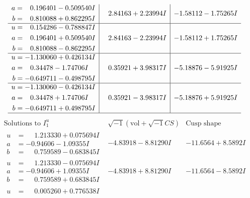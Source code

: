 \documentclass[1p]{elsarticle_modified}
\theoremstyle{definition}
\newcommand{\I}{\sqrt{-1}}
\begin{document}
$$\begin{array}{c|c|c}
\begin{aligned}
a &= \phantom{-}0.196401 - 0.509540 I \\
b &= \phantom{-}0.810088 + 0.862295 I\end{aligned}
 & \phantom{-}2.84163 + 2.23994 I & -1.58112 - 1.75265 I \\ \hline\begin{aligned}
u &= \phantom{-}0.154286 - 0.788847 I \\
a &= \phantom{-}0.196401 + 0.509540 I \\
b &= \phantom{-}0.810088 - 0.862295 I\end{aligned}
 & \phantom{-}2.84163 - 2.23994 I & -1.58112 + 1.75265 I \\ \hline\begin{aligned}
u &= -1.130060 + 0.426134 I \\
a &= \phantom{-}0.34478 - 1.74706 I \\
b &= -0.649711 - 0.498795 I\end{aligned}
 & \phantom{-}0.35921 + 3.98317 I & -5.18876 - 5.91925 I \\ \hline\begin{aligned}
u &= -1.130060 - 0.426134 I \\
a &= \phantom{-}0.34478 + 1.74706 I \\
b &= -0.649711 + 0.498795 I\end{aligned}
 & \phantom{-}0.35921 - 3.98317 I & -5.18876 + 5.91925 I\\
 \hline 
 \end{array}$$\newpage$$\begin{array}{c|c|c}  
\text{Solutions to }I^u_{1}& \I (\text{vol} + \sqrt{-1}CS) & \text{Cusp shape}\\
 \hline 
\begin{aligned}
u &= \phantom{-}1.213330 + 0.075694 I \\
a &= -0.94606 - 1.09355 I \\
b &= \phantom{-}0.759589 - 0.683845 I\end{aligned}
 & -4.83918 - 8.81290 I & -11.6564 + 8.5892 I \\ \hline\begin{aligned}
u &= \phantom{-}1.213330 - 0.075694 I \\
a &= -0.94606 + 1.09355 I \\
b &= \phantom{-}0.759589 + 0.683845 I\end{aligned}
 & -4.83918 + 8.81290 I & -11.6564 - 8.5892 I \\ \hline\begin{aligned}
u &= \phantom{-}0.005260 + 0.776538 I \\

\end{aligned}
\end{array}$$
\end{document}
